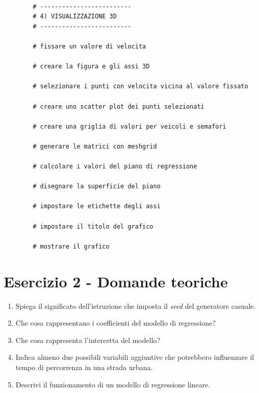 \documentclass[a4paper,12pt]{article}
\begin{document}
\begin{lstlisting}
		
		# -------------------------
		# 4) VISUALIZZAZIONE 3D
		# -------------------------
		
		# fissare un valore di velocita
		
		# creare la figura e gli assi 3D
		
		# selezionare i punti con velocita vicina al valore fissato
		
		# creare uno scatter plot dei punti selezionati
		
		# creare una griglia di valori per veicoli e semafori
		
		# generare le matrici con meshgrid
		
		# calcolare i valori del piano di regressione
		
		# disegnare la superficie del piano
		
		# impostare le etichette degli assi
		
		# impostare il titolo del grafico
		
		# mostrare il grafico
	\end{lstlisting}
	
	\newpage
	
	\section*{Esercizio 2 - Domande teoriche}
	
	\begin{enumerate}
		
		\item Spiega il significato dell'istruzione che imposta il \textit{seed} del generatore casuale.
		
		\item Che cosa rappresentano i coefficienti del modello di regressione?
		
		\item Che cosa rappresenta l'intercetta del modello?
		
		\item Indica almeno due possibili variabili aggiuntive che potrebbero influenzare il tempo di percorrenza in una strada urbana.
		
		\item Descrivi il funzionamento di un modello di regressione lineare.
		
	\end{enumerate}
	
\end{document}
